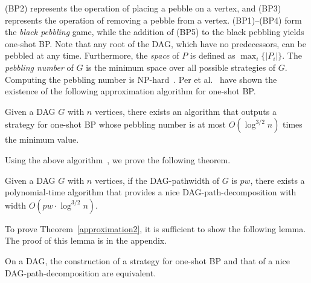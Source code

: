 \documentclass[runningheads]{llncs}
\theoremstyle{plain}
\theoremstyle{definition}
\begin{document}
(BP2) represents the operation of placing a pebble on a vertex, and (BP3) represents the operation of removing a pebble from a vertex. (BP1)--(BP4) form the \emph{black pebbling} game, while the addition of (BP5) to the black pebbling yields one-shot BP. Note that any root of the DAG, which have no predecessors, can be pebbled at any time. Furthermore, the \emph{space} of $P$ is defined as $\max_i \{ |P_i| \}$. The \emph{pebbling number} of $G$ is the minimum space over all possible strategies of $G$. Computing the pebbling number is NP-hard~\cite{art16}. %
%
%
Per et al.~\cite{art20} have shown the existence of the following approximation algorithm for one-shot BP.
%
\begin{proposition}
    Given a DAG $G$ with $n$ vertices, there exists an algorithm that outputs a strategy for one-shot BP whose pebbling number is at most $O(\log ^{3/2} n)$ times the minimum value.
\end{proposition}

Using the above algorithm~\cite{art20}, we prove the following theorem.

\begin{theorem}\label{approximation2}
    Given a DAG $G$ with $n$ vertices, if the DAG-pathwidth of $G$ is $pw$, there exists a polynomial-time algorithm that provides a nice DAG-path-decomposition with width $O(pw \cdot \log ^{3/2} n)$.
\end{theorem}

To prove Theorem~\ref{approximation2}, it is sufficient to show the following lemma. The proof of this lemma is in the appendix.
%
\begin{lemma}\label{lemma_approximation2}
    On a DAG, the construction of a strategy for one-shot BP and that of a nice DAG-path-decomposition are equivalent.
\end{lemma}
\end{document}
